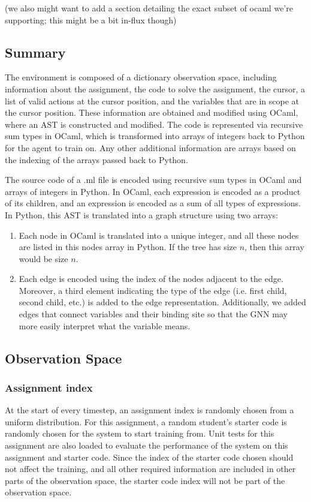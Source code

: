 \documentclass{article}
\begin{document}
\hspace{16}(we also might want to add a section detailing the exact subset of ocaml we’re supporting; this might be a bit in-flux though)

\subsection{Summary}
\hspace{16}The environment is composed of a dictionary observation space, including information about the assignment, the code to solve the assignment, the cursor, a list of valid actions at the cursor position, and the variables that are in scope at the cursor position. These information are obtained and modified using OCaml, where an AST is constructed and modified. The code is represented via recursive sum types in OCaml, which is transformed into arrays of integers back to Python for the agent to train on. Any other additional information are arrays based on the indexing of the arrays passed back to Python. 

\hspace{}The source code of a .ml file is encoded using recursive sum types in OCaml and arrays of integers in Python. In OCaml, each expression is encoded as a product of its children, and an expression is encoded as a sum of all types of expressions. In Python, this AST is translated into a graph structure using two arrays:
\begin{enumerate}
    \item Each node in OCaml is translated into a unique integer, and all these nodes are listed in this nodes array in Python. If the tree has size $n$, then this array would be size $n$. 
    \item Each edge is encoded using the index of the nodes adjacent to the edge. Moreover, a third element indicating the type of the edge (i.e. first child, second child, etc.) is added to the edge representation. Additionally, we added edges that connect variables and their binding site so that the GNN may more easily interpret what the variable means.
\end{enumerate}

\subsection{Observation Space}
\subsubsection{Assignment index}
\hspace{16}At the start of every timestep, an assignment index is randomly chosen from a uniform distribution. For this assignment, a random student’s starter code is randomly chosen for the system to start training from. Unit tests for this assignment are also loaded to evaluate the performance of the system on this assignment and starter code. Since the index of the starter code chosen should not affect the training, and all other required information are included in other parts of the observation space, the starter code index will not be part of the observation space.
\end{document}
